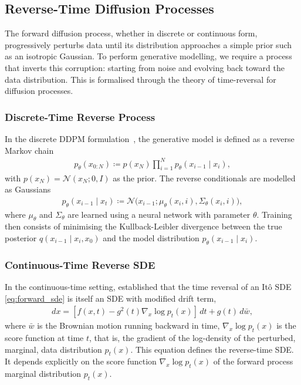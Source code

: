 \documentclass[a4paper,12pt]{article}
\begin{document}
\subsection{Reverse-Time Diffusion Processes}
The forward diffusion process, whether in discrete or continuous form, progressively perturbs data until its distribution approaches a simple prior such as an isotropic Gaussian. To perform generative modelling, we require a process that inverts this corruption: starting from noise and evolving back toward the data distribution. This is formalised through the theory of time-reversal for diffusion processes.

\subsubsection{Discrete-Time Reverse Process}
In the discrete DDPM formulation~\cite{hoDenoisingDiffusionProbabilistic2020}, the generative model is defined as a reverse Markov chain
\begin{align*}
    p_\theta\left(x_{0:N}\right) \coloneq p(x_N) \prod_{i=1}^{N} p_\theta(x_{i-1} \mid x_i),
\end{align*}
with \(p(x_N) = \mathcal{N}(x_N;0,I)\) as the prior. The reverse conditionals are modelled as Gaussians
\begin{align*}
    p_\theta\left(x_{i-1} \mid x_t\right) \coloneq \mathcal{N}\!\big(x_{i-1}; \mu_\theta(x_i,i), \Sigma_\theta(x_i,i)\big),
\end{align*}
where \(\mu_\theta\) and \(\Sigma_\theta\) are learned using a neural network with parameter \(\theta\). Training then consists of minimising the Kullback-Leibler divergence between the true posterior \(q(x_{i-1} \mid x_i, x_0)\) and the model distribution \(p_\theta(x_{i-1} \mid x_i)\).

\subsubsection{Continuous-Time Reverse SDE}
In the continuous-time setting, \citet{andersonReversetimeDiffusionEquation1982} established that the time reversal of an It\^{o} SDE \eqref{eq:forward_sde}
is itself an SDE with modified drift term,
\begin{align}\label{eq:reverse_sde}
    dx = \left[f(x,t) - g^2(t) \nabla_x \log p_t(x)\right]\,dt + g(t)\,d\bar w,
\end{align}
where \(\bar w\) is the Brownian motion running backward in time, \(\nabla_x \log p_t(x)\) is the score function at time \(t\), that is, the gradient of the log-density of the perturbed, marginal, data distribution \(p_t\left(x\right)\). This equation defines the reverse-time SDE. It depends explicitly on the score function \(\nabla_x \log p_t(x)\) of the forward process marginal distribution \(p_t(x)\).
\end{document}
